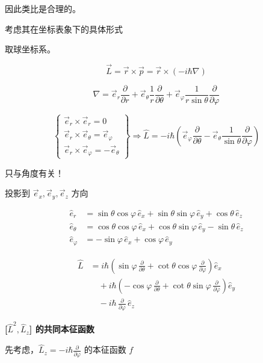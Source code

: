 \documentclass[lang=cn,10pt]{elegantbook}
\begin{document}
因此类比是合理的。

考虑其在坐标表象下的具体形式

取球坐标系。

\[
\vec{L} = \vec{r} \times \vec{p} = \vec{r} \times (-i\hbar \nabla)
\]

\[
\nabla = \vec{e}_r \frac{\partial}{\partial r} + \vec{e}_\theta \frac{1}{r} \frac{\partial}{\partial \theta} + \vec{e}_\varphi \frac{1}{r \sin \theta} \frac{\partial}{\partial \varphi}
\]

\[
\left\{
\begin{array}{l}
	\vec{e}_r \times \vec{e}_r = 0 \\
	\vec{e}_r \times \vec{e}_\theta = \vec{e}_\varphi \\
	\vec{e}_r \times \vec{e}_\varphi = -\vec{e}_\theta
\end{array}
\right\} \Rightarrow \hat{L} = -i\hbar \left( \vec{e}_\varphi \frac{\partial}{\partial \theta} - \vec{e}_\theta \frac{1}{\sin\theta} \frac{\partial}{\partial \varphi} \right)
\]

只与角度有关！

投影到 \(\vec{e}_x, \vec{e}_y, \vec{e}_z\) 方向

\[
\begin{aligned}
	\hat{e}_r &= \sin \theta \cos \varphi \, \hat{e}_x + \sin \theta \sin \varphi \, \hat{e}_y + \cos \theta \, \hat{e}_z \\
	\hat{e}_\theta &= \cos \theta \cos \varphi \, \hat{e}_x + \cos \theta \sin \varphi \, \hat{e}_y - \sin \theta \, \hat{e}_z \\
	\hat{e}_\varphi &= -\sin \varphi \, \hat{e}_x + \cos \varphi \, \hat{e}_y
\end{aligned}
\]

\[
\begin{aligned}
	\hat{L} &= i \hbar \left( \sin \varphi \, \frac{\partial}{\partial \theta} + \cot \theta \cos \varphi \, \frac{\partial}{\partial \varphi} \right) \hat{e}_x \\
	&\quad + i \hbar \left( -\cos \varphi \, \frac{\partial}{\partial \theta} + \cot \theta \sin \varphi \, \frac{\partial}{\partial \varphi} \right) \hat{e}_y \\
	&\quad - i \hbar \, \frac{\partial}{\partial \varphi} \, \hat{e}_z
\end{aligned}
\]


\textbf{[\(\hat{L}^2, \hat{L}_z\)] 的共同本征函数}

先考虑，\(\hat{L}_z = -i\hbar \frac{\partial}{\partial \varphi}\) 的本征函数 \(f\)
\end{document}
